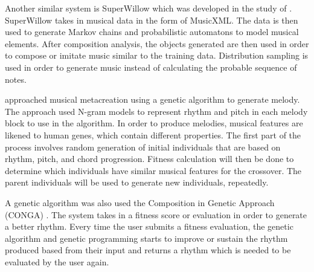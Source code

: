 
Another similar system is SuperWillow which was developed in the study of \citet{schulze2011music}. SuperWillow takes in musical data in the form of MusicXML. The data is then used to generate Markov chains and probabilistic automatons to model musical elements. After composition analysis, the objects generated are then used in order to compose or imitate music similar to the training data. Distribution sampling is used in order to generate music instead of calculating the probable sequence of notes.

\citet{kikuchi2014automatic} approached musical metacreation using a genetic algorithm to generate melody. The approach used N-gram models to represent rhythm and pitch in each melody block to use in the algorithm. In order to produce melodies, musical features are likened to human genes, which contain different properties. The first part of the process involves random generation of initial individuals that are based on rhythm, pitch, and chord progression. Fitness calculation will then be done to determine which individuals have similar musical features for the crossover. The parent individuals will be used to generate new individuals, repeatedly.


A genetic algorithm was also used the Composition in Genetic Approach (CONGA) \citep{tokui2000music}. The system takes in a fitness score or evaluation in order to generate a better rhythm. Every time the user submits a fitness evaluation, the genetic algorithm and genetic programming starts to improve or sustain the rhythm produced based from their input and returns a rhythm which is needed to be evaluated by the user again.

